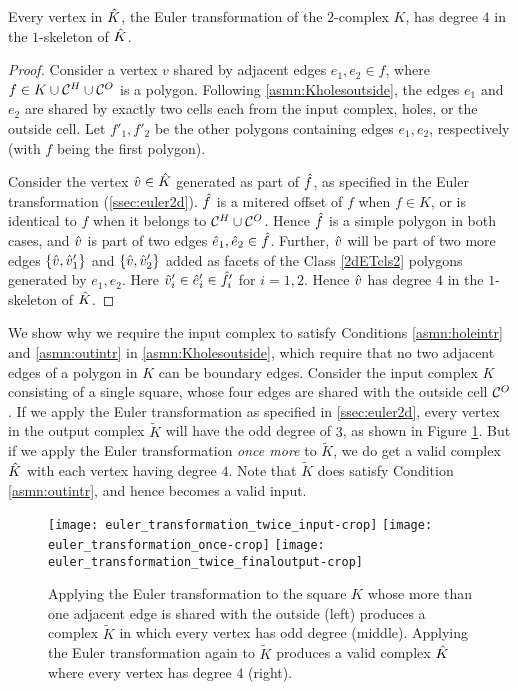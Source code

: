 \begin{thm} \label{thm:deg4ET2d}
  Every vertex in $\hat{K}$, the Euler transformation of the $2$-complex $K$, has degree $4$ in the $1$-skeleton of $\hat{K}$.
\end{thm}
\begin{proof}
  Consider a vertex $v$ shared by adjacent edges $e_1, e_2 \in f$, where $f \in K \cup \mathcal{C}^H \cup \mathcal{C}^O$ is a polygon.
  Following \cref{asmn:Kholesoutside}, the edges $e_1$ and $e_2$ are shared by exactly two cells each from the input complex,  holes, or the outside cell.
  Let $f'_1, f'_2$ be the other polygons containing edges $e_1, e_2$, respectively (with $f$ being the first polygon).

  Consider the vertex $\hat{v} \in \hat{K}$ generated as part of $\hat{f}$, as specified in the Euler transformation (\cref{ssec:euler2d}).
  $\hat{f}$ is a mitered offset of $f$ when $f \in K$, or is identical to $f$ when it belongs to $\mathcal{C}^H \cup \mathcal{C}^O$.
  Hence $\hat{f}$ is a simple polygon in both cases, and $\hat{v}$ is part of two edges $\hat{e}_1, \hat{e}_2 \in \hat{f}$.
  Further, $\hat{v}$ will be part of two more edges $\{\hat{v},\hat{v}'_1\}$ and  $\{\hat{v},\hat{v}'_2\}$  added as facets of the Class \ref{2dETcls2} polygons generated by $e_1, e_2$.
  Here $\hat{v}'_i \in \hat{e}'_i \in \hat{f}'_i$ for $i=1,2$.
  Hence $\hat{v}$ has degree $4$ in the $1$-skeleton of $\hat{K}$.
\end{proof}


\begin{rem}
  \label{rem:adjbdyedges}
  {\rm 
    We show why we require the input complex to satisfy Conditions \ref{asmn:holeintr} and \ref{asmn:outintr} in \cref{asmn:Kholesoutside}, which require that no two adjacent edges of a polygon in $K$ can be boundary edges.
    Consider the input complex $K$ consisting of a single square, whose four edges are shared with the outside cell $\mathcal{C}^O$.
    If we apply the Euler transformation as specified in \cref{ssec:euler2d}, every vertex in the output complex  $\tilde{K}$ will have the odd degree of $3$, as shown in Figure \ref{fig:outintr}.
    But if we apply the Euler transformation \emph{once more} to $\tilde{K}$, we do get a valid complex $\hat{K}$ with each vertex having degree $4$.
    Note that $\tilde{K}$ does satisfy Condition \ref{asmn:outintr}, and hence becomes a valid input.
    \begin{figure}[htp!]
      \centering
      \texttt{[image: euler\_transformation\_twice\_input-crop]}
      \quad
      \texttt{[image: euler\_transformation\_once-crop]}
      \quad
      \texttt{[image: euler\_transformation\_twice\_finaloutput-crop]}
      \caption{Applying the Euler transformation to the square $K$ whose more than one adjacent edge is shared with the outside (left) produces a complex $\tilde{K}$ in which every vertex has odd degree (middle).
      Applying the Euler transformation again to $\tilde{K}$ produces a valid complex $\hat{K}$ where every vertex has degree $4$ (right).}
      \label{fig:outintr}
    \end{figure}
  }
\end{rem}

